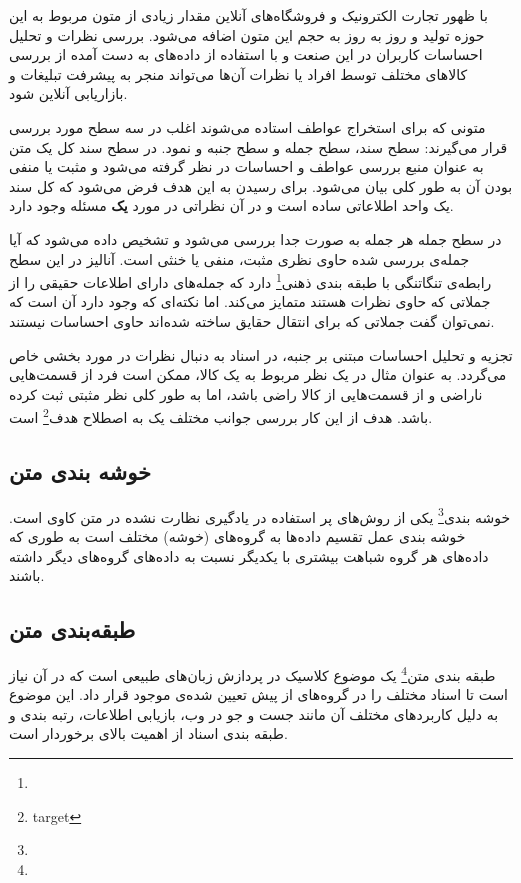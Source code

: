 \documentclass[12pt, a4paper, oneside]{report}
\begin{document}
با ظهور تجارت الکترونیک و فروشگاه‌های آنلاین مقدار زیادی از متون مربوط به این حوزه تولید و روز به روز
به حجم این متون اضافه می‌شود. بررسی نظرات و تحلیل احساسات کاربران در این صنعت و با استفاده از داده‌های به دست
آمده از بررسی کالاهای مختلف توسط افراد یا نظرات آن‌ها می‌تواند منجر به پیشرفت تبلیغات و بازاریابی آنلاین شود\cite{DBLP:journals/corr/AllahyariPASTGK17a}.

متونی که برای استخراج عواطف استاده می‌شوند اغلب در سه سطح مورد بررسی قرار می‌گیرند: سطح سند، سطح جمله و سطح جنبه و نمود.
در سطح سند کل یک متن به عنوان منبع بررسی عواطف و احساسات در نظر گرفته می‌شود و مثبت یا منفی بودن آن
به طور کلی بیان می‌شود. برای رسیدن به این هدف فرض می‌شود که کل سند یک واحد اطلاعاتی ساده است و در آن
نظراتی در مورد
\textbf{یک}
مسئله وجود دارد.
\cite{zhang2018deep}

در سطح جمله هر جمله به صورت جدا بررسی می‌شود و تشخیص داده می‌شود که آیا جمله‌ی بررسی شده حاوی نظری مثبت، منفی
یا خنثی است. آنالیز در این سطح رابطه‌ی تنگاتنگی با
طبقه بندی ذهنی\footnote{}
دارد که جمله‌های دارای اطلاعات حقیقی را از جملاتی که حاوی نظرات هستند متمایز می‌کند. اما نکته‌ای که وجود دارد آن است که
نمی‌توان گفت جملاتی که برای انتقال حقایق ساخته شده‌اند حاوی احساسات نیستند.
\cite{zhang2018deep}

تجزیه و تحلیل احساسات مبتنی بر جنبه، در اسناد به دنبال نظرات در مورد بخشی خاص می‌گردد. به عنوان مثال در یک نظر
مربوط به یک کالا، ممکن است فرد از قسمت‌هایی ناراضی و از قسمت‌هایی از کالا راضی باشد، اما به طور کلی نظر مثبتی
ثبت کرده باشد. هدف از این کار بررسی جوانب مختلف یک به اصطلاح
هدف\footnote{target}
است.
\cite{zhang2018deep}

\subsection{خوشه بندی متن}

خوشه بندی\footnote{}
یکی از روش‌های پر استفاده در یادگیری نظارت نشده در متن کاوی است. خوشه بندی عمل تقسیم داده‌ها به گروه‌های
(خوشه)
مختلف است به طوری که داده‌های هر گروه شباهت بیشتری با یکدیگر نسبت به داده‌های گروه‌های دیگر داشته باشند\cite{DBLP:journals/corr/AllahyariPASTGK17a}.


\subsection{طبقه‌بندی متن}

طبقه بندی متن\footnote{}
یک موضوع کلاسیک در پردازش زبان‌های طبیعی است که در آن نیاز است تا اسناد مختلف را در گروه‌های
از پیش تعیین شده‌ی موجود قرار داد\cite{c9d4fbeac7324056bed5d1cb262a7268}.
این موضوع به دلیل کاربرد‌های مختلف آن مانند جست و جو در وب، بازیابی اطلاعات،
رتبه بندی و طبقه بندی اسناد از اهمیت بالای برخوردار است\cite{joulin2016fasttext}.
\end{document}
